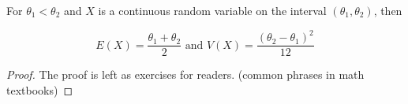 \begin{theorem}
    For $\theta_1 < \theta_2$ and $X$ is a continuous random variable on the interval $(\theta_1, \theta_2)$,
    then

    \[
    E(X) = \frac{\theta_1 + \theta_2}{2} \text{ and } V(X) = \frac{{(\theta_2 - \theta_1)}^2}{12}
    \]
\end{theorem}
\begin{proof}
    The proof is left as exercises for readers. (common phrases in math textbooks)
\end{proof}
